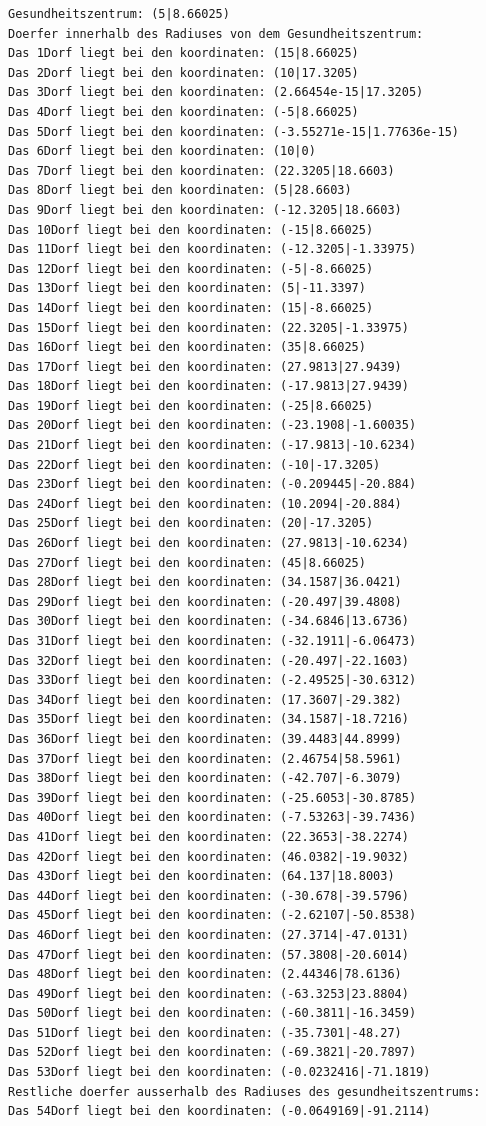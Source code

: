 \documentclass{article}
\begin{document}
\begin{verbatim}
Gesundheitszentrum: (5|8.66025)
Doerfer innerhalb des Radiuses von dem Gesundheitszentrum: 
Das 1Dorf liegt bei den koordinaten: (15|8.66025)
Das 2Dorf liegt bei den koordinaten: (10|17.3205)
Das 3Dorf liegt bei den koordinaten: (2.66454e-15|17.3205)
Das 4Dorf liegt bei den koordinaten: (-5|8.66025)
Das 5Dorf liegt bei den koordinaten: (-3.55271e-15|1.77636e-15)
Das 6Dorf liegt bei den koordinaten: (10|0)
Das 7Dorf liegt bei den koordinaten: (22.3205|18.6603)
Das 8Dorf liegt bei den koordinaten: (5|28.6603)
Das 9Dorf liegt bei den koordinaten: (-12.3205|18.6603)
Das 10Dorf liegt bei den koordinaten: (-15|8.66025)
Das 11Dorf liegt bei den koordinaten: (-12.3205|-1.33975)
Das 12Dorf liegt bei den koordinaten: (-5|-8.66025)
Das 13Dorf liegt bei den koordinaten: (5|-11.3397)
Das 14Dorf liegt bei den koordinaten: (15|-8.66025)
Das 15Dorf liegt bei den koordinaten: (22.3205|-1.33975)
Das 16Dorf liegt bei den koordinaten: (35|8.66025)
Das 17Dorf liegt bei den koordinaten: (27.9813|27.9439)
Das 18Dorf liegt bei den koordinaten: (-17.9813|27.9439)
Das 19Dorf liegt bei den koordinaten: (-25|8.66025)
Das 20Dorf liegt bei den koordinaten: (-23.1908|-1.60035)
Das 21Dorf liegt bei den koordinaten: (-17.9813|-10.6234)
Das 22Dorf liegt bei den koordinaten: (-10|-17.3205)
Das 23Dorf liegt bei den koordinaten: (-0.209445|-20.884)
Das 24Dorf liegt bei den koordinaten: (10.2094|-20.884)
Das 25Dorf liegt bei den koordinaten: (20|-17.3205)
Das 26Dorf liegt bei den koordinaten: (27.9813|-10.6234)
Das 27Dorf liegt bei den koordinaten: (45|8.66025)
Das 28Dorf liegt bei den koordinaten: (34.1587|36.0421)
Das 29Dorf liegt bei den koordinaten: (-20.497|39.4808)
Das 30Dorf liegt bei den koordinaten: (-34.6846|13.6736)
Das 31Dorf liegt bei den koordinaten: (-32.1911|-6.06473)
Das 32Dorf liegt bei den koordinaten: (-20.497|-22.1603)
Das 33Dorf liegt bei den koordinaten: (-2.49525|-30.6312)
Das 34Dorf liegt bei den koordinaten: (17.3607|-29.382)
Das 35Dorf liegt bei den koordinaten: (34.1587|-18.7216)
Das 36Dorf liegt bei den koordinaten: (39.4483|44.8999)
Das 37Dorf liegt bei den koordinaten: (2.46754|58.5961)
Das 38Dorf liegt bei den koordinaten: (-42.707|-6.3079)
Das 39Dorf liegt bei den koordinaten: (-25.6053|-30.8785)
Das 40Dorf liegt bei den koordinaten: (-7.53263|-39.7436)
Das 41Dorf liegt bei den koordinaten: (22.3653|-38.2274)
Das 42Dorf liegt bei den koordinaten: (46.0382|-19.9032)
Das 43Dorf liegt bei den koordinaten: (64.137|18.8003)
Das 44Dorf liegt bei den koordinaten: (-30.678|-39.5796)
Das 45Dorf liegt bei den koordinaten: (-2.62107|-50.8538)
Das 46Dorf liegt bei den koordinaten: (27.3714|-47.0131)
Das 47Dorf liegt bei den koordinaten: (57.3808|-20.6014)
Das 48Dorf liegt bei den koordinaten: (2.44346|78.6136)
Das 49Dorf liegt bei den koordinaten: (-63.3253|23.8804)
Das 50Dorf liegt bei den koordinaten: (-60.3811|-16.3459)
Das 51Dorf liegt bei den koordinaten: (-35.7301|-48.27)
Das 52Dorf liegt bei den koordinaten: (-69.3821|-20.7897)
Das 53Dorf liegt bei den koordinaten: (-0.0232416|-71.1819)
Restliche doerfer ausserhalb des Radiuses des gesundheitszentrums: 
Das 54Dorf liegt bei den koordinaten: (-0.0649169|-91.2114)
\end{verbatim}
\end{document}
